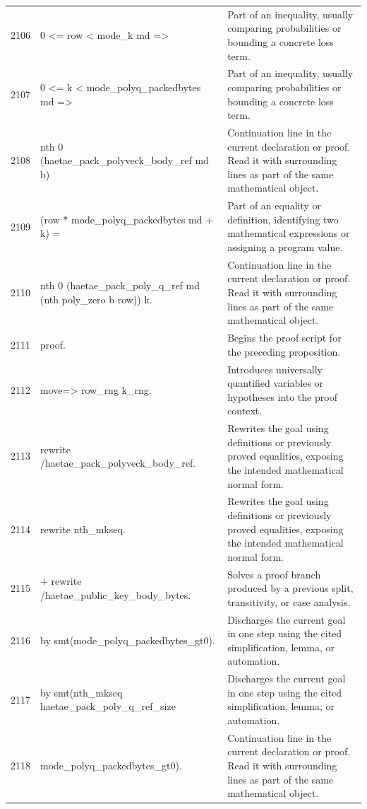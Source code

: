 \documentclass[10pt]{article}
\begin{document}
\begin{longtable}{r L{0.53\textwidth} L{0.37\textwidth}}
2106 & {\ttfamily\scriptsize   0 <= row < mode\_k md =>} & Part of an inequality, usually comparing probabilities or bounding a concrete loss term. \\
2107 & {\ttfamily\scriptsize   0 <= k < mode\_polyq\_packedbytes md =>} & Part of an inequality, usually comparing probabilities or bounding a concrete loss term. \\
2108 & {\ttfamily\scriptsize   nth 0 (haetae\_pack\_polyveck\_body\_ref md b)} & Continuation line in the current declaration or proof.  Read it with surrounding lines as part of the same mathematical object. \\
2109 & {\ttfamily\scriptsize     (row * mode\_polyq\_packedbytes md + k) =} & Part of an equality or definition, identifying two mathematical expressions or assigning a program value. \\
2110 & {\ttfamily\scriptsize   nth 0 (haetae\_pack\_poly\_q\_ref md (nth poly\_zero b row)) k.} & Continuation line in the current declaration or proof.  Read it with surrounding lines as part of the same mathematical object. \\
2111 & {\ttfamily\scriptsize proof.} & Begins the proof script for the preceding proposition. \\
2112 & {\ttfamily\scriptsize move=> row\_rng k\_rng.} & Introduces universally quantified variables or hypotheses into the proof context. \\
2113 & {\ttfamily\scriptsize rewrite /haetae\_pack\_polyveck\_body\_ref.} & Rewrites the goal using definitions or previously proved equalities, exposing the intended mathematical normal form. \\
2114 & {\ttfamily\scriptsize rewrite nth\_mkseq.} & Rewrites the goal using definitions or previously proved equalities, exposing the intended mathematical normal form. \\
2115 & {\ttfamily\scriptsize + rewrite /haetae\_public\_key\_body\_bytes.} & Solves a proof branch produced by a previous split, transitivity, or case analysis. \\
2116 & {\ttfamily\scriptsize   by smt(mode\_polyq\_packedbytes\_gt0).} & Discharges the current goal in one step using the cited simplification, lemma, or automation. \\
2117 & {\ttfamily\scriptsize by smt(nth\_mkseq haetae\_pack\_poly\_q\_ref\_size} & Discharges the current goal in one step using the cited simplification, lemma, or automation. \\
2118 & {\ttfamily\scriptsize        mode\_polyq\_packedbytes\_gt0).} & Continuation line in the current declaration or proof.  Read it with surrounding lines as part of the same mathematical object. \\

\end{longtable}
\end{document}
